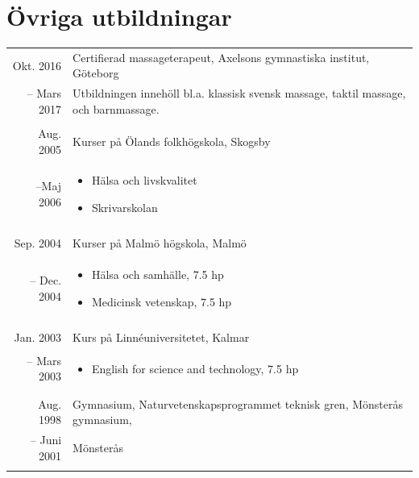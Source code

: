 \documentclass[11pt,a4paper]{article}
\begin{document}
\section{Övriga utbildningar}
\begin{tabularx}{\textwidth}{r|X}
	
	Okt. 2016& Certifierad massageterapeut, Axelsons gymnastiska institut, Göteborg\\
	-- Mars 2017& \footnotesize{Utbildningen innehöll bl.a. klassisk svensk massage, taktil massage, och barnmassage.} \\
	\multicolumn{2}{c}{} \\
	
	Aug. 2005& Kurser på Ölands folkhögskola, Skogsby \\
	--Maj 2006&\footnotesize{\vspace{-5pt}
		\begin{itemize}[leftmargin=10pt, topsep=-12.5pt]
			\item Hälsa och livskvalitet
			\item Skrivarskolan
		\end{itemize}\vspace{-30pt} 
	}\\
	\multicolumn{2}{c}{} \\
	
	Sep. 2004& Kurser på Malmö högskola, Malmö\\
	-- Dec. 2004&\footnotesize{\vspace{-5pt}
		\begin{itemize}[leftmargin=10pt, topsep=-12.5pt]
			\item Hälsa och samhälle, 7.5 hp
			\item Medicinsk vetenskap, 7.5 hp
		\end{itemize}\vspace{-30pt} 
	}\\
	\multicolumn{2}{c}{} \\	
		
	Jan. 2003& Kurs på Linnéuniversitetet, Kalmar\\
	-- Mars 2003&\footnotesize{\vspace{-5pt}
		\begin{itemize}[leftmargin=10pt, topsep=-12.5pt]
			\item English for science and technology, 7.5 hp
		\end{itemize}\vspace{-30pt} 
	}\\
	
	\multicolumn{2}{c}{} \\
	
	Aug. 1998& Gymnasium, Naturvetenskapsprogrammet teknisk gren, Mönsterås gymnasium,\\
	-- Juni 2001&Mönsterås\\
	\multicolumn{2}{c}{} \\
\end{tabularx}
\end{document}
